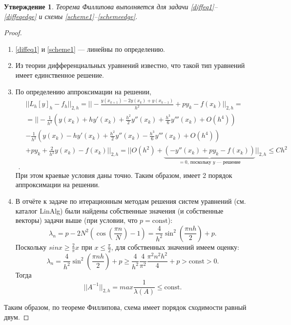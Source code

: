 \documentclass[14pt,a4paper]{extarticle}
\newtheorem{proposition}{Утверждение} %
\newcommand{\1}{\mathbbm{1}}
\begin{document}
\begin{proposition}
    Теорема Филлипова выполняется для задачи \eqref{diffeq1}--\eqref{diffeqedge} и схемы \eqref{scheme1}--\eqref{schemeedge}.
\end{proposition}
\begin{proof}
    \begin{enumerate}
        \item  \eqref{diffeq1} и \eqref{scheme1} --- линейны по определению.
        \item Из теории дифференциальных уравнений известно, что такой тип уравнений имеет единственное решение.
        \item По определению аппроксимации на решении,
        \begin{align*}
            & || L_h [y]_h - f_h || _{2, h} = || -\frac{y(x_{k+1}) - 2 y(x_k) + y(x_{k-1})}{h^2} + p y_k - f(x_k) || _{2, h} = \\ 
            & =|| -\frac{1}{h^2}\left(y(x_{k}) + h y'(x_{k}) + \frac{h^2}{2} y''(x_{k}) + \frac{h^3}{6} y'''(x_{k}) + O(h^4)\right)  \\
            & -\frac{1}{h^2}\left(y(x_{k}) - h y'(x_{k}) + \frac{h^2}{2} y''(x_{k}) - \frac{h^3}{6} y'''(x_{k}) + O(h^4)\right) \\ 
            & + p y_k + \frac{2}{h^2} y(x_k) - f(x_k) || _{2, h} = || O(h^2) + \underbrace{(- y''(x_{k}) + p y_k - f(x_k))}_{=0 \text{, поскольку $y$ --- решение}} ||_{2, h} \leq C h^2 \\ .           
        \end{align*}
        При этом краевые условия даны точно. Таким образом, имеет 2 порядок аппроксимации на решении.
        \item В отчёте к задаче по итерационным методам решения систем уравнений (см. каталог LinAlg) были найдены собственные значения 
        (и собственные векторы) задачи выше (при условии, что $p = \text{const}$): 
        \begin{equation*}
            \lambda_n = p - 2 N^2 (\cos(\frac{\pi n}{N}) - 1) = \frac{4}{h^2} \sin^2(\frac{\pi n h}{2}) + p.
        \end{equation*}
        Поскольку $sin x \geq \frac{2}{\pi} x $ при $x \leq \frac{\pi}{2}$, для собственных значений имеем оценку:
        \begin{equation*}
            \lambda_n = \frac{4}{h^2} \sin^2(\frac{\pi n h}{2}) + p \geq \frac{4}{h^2} \frac{4}{\pi ^2} \frac{\pi ^2 n^2 h^2}{4} + p > \text{const} > 0.
        \end{equation*}
        Тогда
        \begin{equation*}
            || A^{-1} ||_{2,h} = max \frac{1}{\lambda(A)} \leq \text{const}.
        \end{equation*}
    \end{enumerate}
    Таким образом, по теореме Филлипова, схема имеет порядок сходимости равный двум.
\end{proof}
\end{document}
